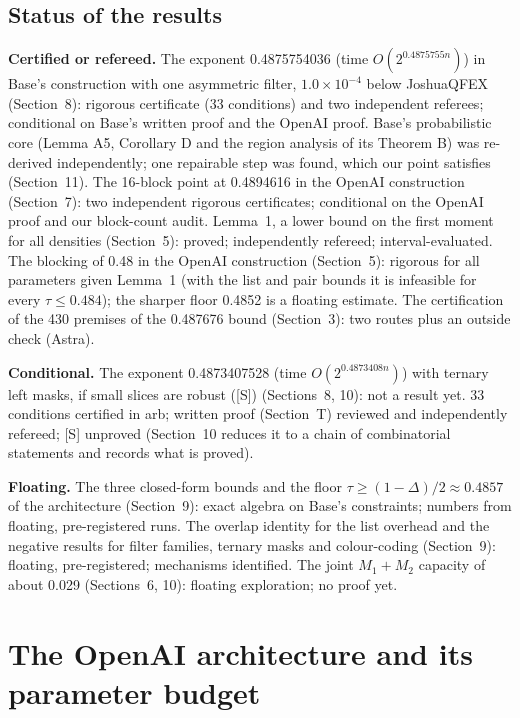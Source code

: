 \documentclass[11pt]{article}
\theoremstyle{plain}
\begin{document}
\subsection*{Status of the results}
\textbf{Certified or refereed.} The exponent 0.4875754036 (time $O(2^{0.4875755n})$) in Base's construction with one asymmetric filter, $1.0\times10^{-4}$ below JoshuaQFEX (Section~8): rigorous certificate (33 conditions) and two independent referees; conditional on Base's written proof and the OpenAI proof. Base's probabilistic core (Lemma A5, Corollary D and the region analysis of its Theorem B) was re-derived independently; one repairable step was found, which our point satisfies (Section~11). The 16-block point at 0.4894616 in the OpenAI construction (Section~7): two independent rigorous certificates; conditional on the OpenAI proof and our block-count audit. Lemma~1, a lower bound on the first moment for all densities (Section~5): proved; independently refereed; interval-evaluated. The blocking of 0.48 in the OpenAI construction (Section~5): rigorous for all parameters given Lemma~1 (with the list and pair bounds it is infeasible for every $\tau \le 0.484$); the sharper floor 0.4852 is a floating estimate. The certification of the 430 premises of the 0.487676 bound (Section~3): two routes plus an outside check (Astra).

\textbf{Conditional.} The exponent 0.4873407528 (time $O(2^{0.4873408n})$) with ternary left masks, if small slices are robust ([S]) (Sections~8, 10): not a result yet. 33 conditions certified in arb; written proof (Section~T) reviewed and independently refereed; [S] unproved (Section~10 reduces it to a chain of combinatorial statements and records what is proved).

\textbf{Floating.} The three closed-form bounds and the floor $\tau \ge (1 - \Delta)/2 \approx 0.4857$ of the architecture (Section~9): exact algebra on Base's constraints; numbers from floating, pre-registered runs. The overlap identity for the list overhead and the negative results for filter families, ternary masks and colour-coding (Section~9): floating, pre-registered; mechanisms identified. The joint $M_1 + M_2$ capacity of about 0.029 (Sections~6, 10): floating exploration; no proof yet.

\section{The OpenAI architecture and its parameter budget}
\end{document}
